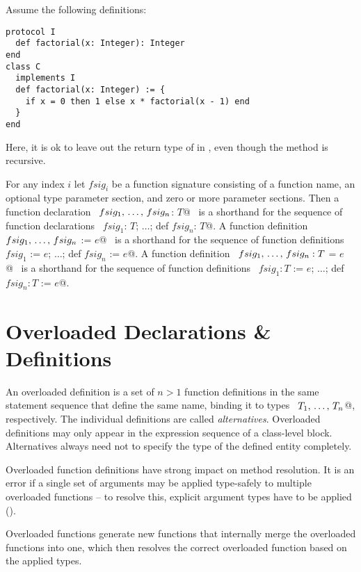 \example Assume the following definitions:
\begin{lstlisting}
protocol I
  def factorial(x: Integer): Integer
end
class C 
  implements I
  def factorial(x: Integer) := {
    if x = 0 then 1 else x * factorial(x - 1) end
  }
end
\end{lstlisting}
Here, it is ok to leave out the return type of \lstinline@factorial@
in \lstinline@C@, even though the method is recursive. 

For any index $i$ let $fsig_i$ be a function signature consisting of a function
name, an optional type parameter section, and zero or more parameter
sections. Then a function declaration 
~\lstinline@def $fsig_1 ,\, \ldots ,\, fsig_n$: $T$@~ 
is a shorthand for the sequence of function
declarations ~\lstinline@def $fsig_1$: $T$; $\ldots$; def $fsig_n$: $T$@.  
A function definition ~\lstinline@def $fsig_1 ,\, \ldots ,\, fsig_n$ := $e$@~ is a
shorthand for the sequence of function definitions 
~\lstinline@def $fsig_1$ := $e$; $\ldots$; def $fsig_n$ := $e$@.  
A function definition
~\lstinline@def $fsig_1 ,\, \ldots ,\, fsig_n: T$ = $e$@~ is a shorthand for the
sequence of function definitions 
~\lstinline@def $fsig_1: T$ := $e$; $\ldots$; def $fsig_n: T$ := $e$@.

\section{Overloaded Declarations \& Definitions}
\label{sec:overloaded-definitions}


An overloaded definition is a set of $n > 1$ function
definitions in the same statement sequence that define the same name,
binding it to types ~\lstinline@$T_1 ,\, \ldots ,\, T_n$@, respectively.
The individual definitions are called {\em alternatives}. Overloaded
definitions may only appear in the expression sequence of a class-level block.
Alternatives always need not to specify the type of the defined entity
completely.

Overloaded function definitions have strong impact on method resolution. It is an error if a single set of arguments may be applied type-safely to multiple overloaded functions -- to resolve this, explicit argument types have to be applied ().

Overloaded functions generate new functions that internally merge the overloaded functions into one, which then resolves the correct overloaded function based on the applied types.

